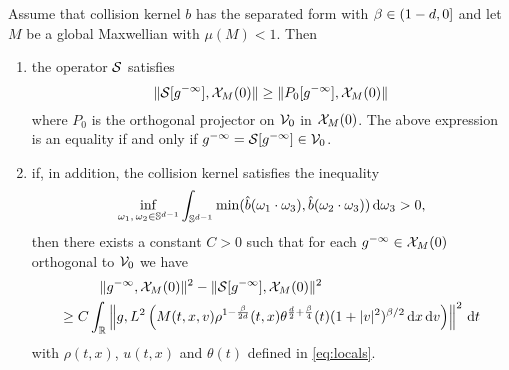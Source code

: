 \begin{theorem}
	\label{th:sc:2}
	Assume that collision kernel $b$ has the separated form with $\beta\in ( 1-d ,0]$ and let $M$ be a global Maxwellian with $\mu(M)<1$. Then
	\begin{enumerate}
		\item the operator $\mathcal S$ satisfies \[\|\mathcal S[{g^{-\infty}}],{\mathcal X_M(0)}\|\ge \|P_0[{g^{-\infty}}],{\mathcal X_M(0)}\|\]
		where $P_0$ is the orthogonal projector on ${\mathcal V_0}$ in ${\mathcal X_M(0)}$. The  above expression is an equality  if and only if ${g^{-\infty}}=\mathcal S[{g^{-\infty}}]\in {\mathcal V_0}$.
		\item if, in addition, the collision kernel satisfies the inequality
		\[\inf_{\omega_1,\, \omega_2\in{\mathbb S^{d-1}}}\int_{{\mathbb S^{d-1}}} \min(\hat b(\omega_1\cdot \omega_3),\hat  b(\omega_2\cdot \omega_3)){\,\mathrm{d} \omega}_3>0,\]
		then there exists a constant $C>0$ such that for each $ {g^{-\infty}}\in{\mathcal X_M(0)}$ orthogonal to  $ {\mathcal V_0}$ we have 
		\begin{equation}\label{eq:key}
			\begin{aligned}
					 \|& {g^{-\infty}} ,{\mathcal X_M(0)}\|^2-\|\mathcal S[{g^{-\infty}}],{\mathcal X_M(0)}\|^2 
					 \\ \ge C \int_{{\mathbb R}}&\left\|g,L^2\left(M(t,x,v)\rho^{1-\frac{\beta}{2d}}(t,x)\theta^{\frac{d}{2}+\frac{ \beta}{4}}	(t)(1+|v|^2)^{\beta/2}{\,\mathrm{d} x}{\,\mathrm{d} v} \right)\right\|^2{\,\mathrm dt}
				\end{aligned}
		\end{equation}	
		with $\rho(t,x)$, $u(t,x)$ and $\theta(t)$ defined in \eqref{eq:locals}.
 	\end{enumerate}
\end{theorem}
